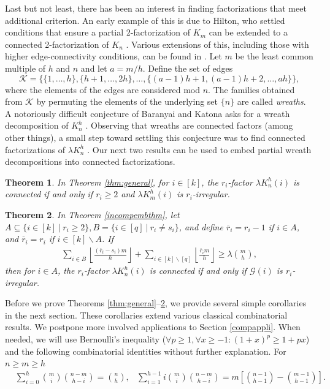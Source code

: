 \documentclass[12pt,oneside]{amsart}
\newtheorem{theorem}{Theorem}[section]
\newcommand{\cc}{\mathcal}
\newcommand\rounddown[1]{\left\lfloor#1\right\rfloor}
\begin{document}
Last but not least, there has been an interest in finding factorizations that meet additional criterion. 
An early example of this  is due to Hilton, who settled conditions that ensure a partial 2-factorization of $K_m$ can be extended to a connected 2-factorization of $K_n$ \cite{MR746544}. Various extensions of this, including those with higher edge-connectivity conditions, can be found in \cite{MR1983358, MR2325799, MR1315436}. Let $m$ be the least common multiple of $h$ and $n$ and let $a=m/h$. Define the set of edges
$$\mathscr K=\{ \{1,\dots,h\}, \{h+1,\dots,2h\},\dots, \{(a-1)h+1,(a-1)h+2,\dots,ah\}\},$$ 
where the elements of the edges are considered mod $n$. The families obtained from $\mathscr K$ by permuting the elements of the underlying set $\{n\}$ are called {\it wreaths}.  A notoriously difficult conjecture of Baranyai and Katona asks for a wreath decomposition of $K_n^h$ \cite{MR1180500}. Observing that wreaths are connected factors (among other things), a small step toward settling this conjecture was to find connected factorizations of $\lambda K_n^h$  \cite{MR3213845}. Our next two results can be used to embed partial wreath decompositions into connected factorizations. 
\begin{theorem} \label{connthmcomb}
In Theorem \ref{thm:general},  for  $i\in [k]$, the $r_i$-factor  $\lambda K_n^h(i)$ is connected if and only if $r_i\geq 2$ and $\lambda K_m^h(i)$ is $r_i$-irregular.
\end{theorem}
\begin{theorem} \label{connthmcomb2} 
In Theorem \ref{incompembthm},  let $A\subseteq \{i \in [k]\ |\ r_i\geq 2\}, B=\{i\in [q] \ |\ r_i\neq s_i\}$, and define $\overline {r}_i=r_i-1$ if $i\in A$, and  $\overline {r}_i=r_i$ if $i\in [k]\backslash A$. If 
\begin{align*} 
    \sum_{i\in B} \rounddown{\frac{(\overline {r}_i-s_i)m}{h}}+\sum_{i\in [k]\backslash [q]} \rounddown{\frac{\overline {r}_i m}{h}} \geq \lambda\binom{m}{h},
\end{align*}
then for  $i\in A$, the $r_i$-factor   $\lambda K_n^h(i)$ is connected if and only if $\cc G(i)$ is $r_i$-irregular.
\end{theorem}

Before we prove Theorems \ref{thm:general}--\ref{connthmcomb2},  we provide several simple corollaries in the next section. These corollaries extend various classical combinatorial results. We postpone more involved applications to Section \ref{compappli}. When needed, we will  use  Bernoulli's inequality ($\forall p\geq 1, \forall x\geq -1: (1+x)^p\geq 1+px$) and the following combinatorial identities without further explanation. For  $n\geq m\geq h$
\begin{align*}
&\sum_{i=0}^h\binom{m}{i}\binom{n-m}{h-i}=\binom{n}{h}, 
&\sum_{i=1}^{h-1} i\binom{m}{i}\binom{n-m}{h-i}=m\left [\binom{n-1}{h-1}-\binom{m-1}{h-1}\right ].
\end{align*}
\end{document}

